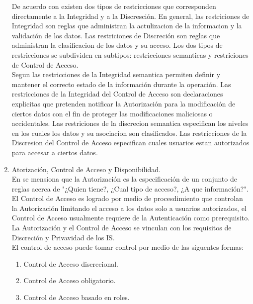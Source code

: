 \documentclass[runningheads,a4paper]{llncs}
\begin{document}
\begin{enumerate}
De acuerdo con \cite{CoSMoIntroduction} existen dos tipos de restricciones que corresponden directamente a la Integridad y a la Discresción. En general, las restriciones de Integridad son reglas que administran la actulizacion de la informacion y la validación de los datos. Las restriciones de Discreción son reglas que administran la clasificacion de los datos y su acceso. Los dos tipos de restricciones se subdividen en subtipos: restricciones semanticas y restriciones de Control de Acceso.\\

Segun \cite{CoSMoIntroduction} las restricciones de la Integridad semantica permiten definir y mantener el correcto estado de la información durante la operación. Las restricciones de la Integridad del Control de Acceso son declaraciones explicitas que pretenden notificar la Autorización para la modificación de ciertos datos con el fin de proteger las modificaciones maliciosas o accidentales. Las restriciones de la discrecion semantica especifican los niveles en los cuales los datos y su asociacion son clasificados. Las restricciones de la Discresion del Control de Acceso especifican cuales usuarios estan autorizados para accesar a ciertos datos.\\

	\item Atorización, Control de Acceso y Disponibilidad.\\

En \cite{CoSMoIntroduction} se mensiona que la Autorización es la especificación de un conjunto de reglas acerca de "¿Quien tiene?, ¿Cual tipo de acceso?, ¿A que información?". El Control de Acceso es logrado por medio de procesdimiento que controlan la Autorización  limitando el acceso a los datos solo a usuarios autorizados, el Control de Acceso usualmente requiere de la Autenticación como prerequisito. La Autorización y el Control de Acceso se vinculan con los requisitos de Discreción y Privavidad de los \gls{IS}.\\

El control de acceso puede tomar control por medio de las siguentes formas:\\

\begin{enumerate}
	\item Control de Acceso discrecional.
	\item Control de Acceso obligatorio.
	\item Control de Acceso basado en roles.\\
\end{enumerate}


\end{enumerate}
\end{document}
